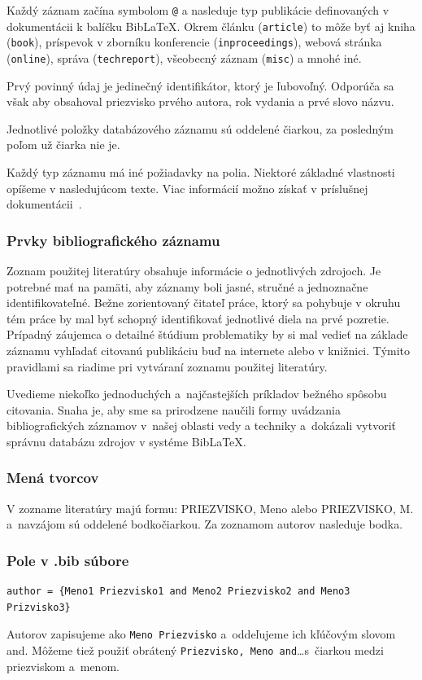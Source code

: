 Každý záznam začína symbolom \verb|@| a nasleduje typ publikácie definovaných v dokumentácii k balíčku Bib\LaTeX.
Okrem článku (\verb|article|) to môže byť aj kniha (\verb|book|),
príspevok v zborníku konferencie (\verb|inproceedings|),
webová stránka (\verb|online|),
správa (\verb|techreport|),
všeobecný záznam (\verb|misc|) a mnohé iné.

Prvý povinný údaj je jedinečný identifikátor, ktorý je ľubovoľný.
Odporúča sa však aby obsahoval priezvisko prvého autora, rok vydania a prvé slovo názvu.

Jednotlivé položky databázového záznamu sú oddelené čiarkou,
za posledným poľom už čiarka nie je.

Každý typ záznamu má iné požiadavky na polia. 
Niektoré základné vlastnosti opíšeme v nasledujúcom texte.
Viac informácií možno získať v príslušnej dokumentácii~\cite{Hoftich2022iso690}.

\subsubsection{Prvky bibliografického záznamu}
Zoznam použitej literatúry obsahuje informácie o jednotlivých zdrojoch. Je potrebné mať na pamäti, aby záznamy boli jasné, stručné a jednoznačne identifikovateľné. Bežne zorientovaný čitateľ práce, ktorý sa pohybuje v okruhu tém práce by mal byť schopný identifikovať jednotlivé diela na prvé pozretie. Prípadný záujemca o detailné štúdium problematiky by si mal vedieť na základe záznamu vyhľadať citovanú publikáciu buď na internete alebo v knižnici. Týmito pravidlami sa riadime pri vytváraní zoznamu použitej literatúry. 

Uvedieme niekoľko jednoduchých a~najčastejších príkladov bežného 
spôsobu citovania.
Snaha je, aby sme sa prirodzene naučili formy uvádzania 
bibliografických záznamov v~našej oblasti vedy a techniky
a~dokázali vytvoriť správnu databázu zdrojov v systéme Bib\LaTeX.

\subsubsection*{Mená tvorcov}
V zozname literatúry majú formu: PRIEZVISKO, Meno alebo PRIEZVISKO, M. a~navzájom sú oddelené bodkočiarkou.
Za zoznamom autorov nasleduje bodka.

\subsubsection*{\normalsize Pole v .bib súbore}
\begin{verbatim}
author = {Meno1 Priezvisko1 and Meno2 Priezvisko2 and Meno3 Prizvisko3}
\end{verbatim}
Autorov zapisujeme ako \verb|Meno Priezvisko| a~oddeľujeme ich kľúčovým slovom and.
Môžeme tiež použiť obrátený \verb|Priezvisko, Meno and|\dots s~čiarkou medzi priezviskom a~menom.

